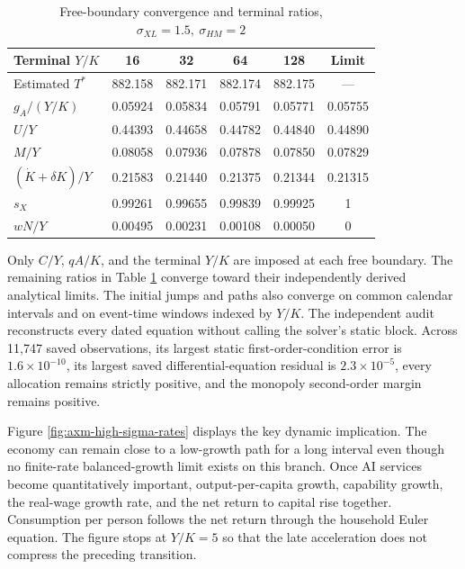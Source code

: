 \begin{table}[H]
\centering
\small
\caption{Free-boundary convergence and terminal ratios,
\(\sigma_{XL}=1.5,\ \sigma_{HM}=2\)}
\label{tab:axm-high-sigma-convergence}
\begin{tabular}{lccccc}
\toprule
Terminal \(Y/K\) & 16 & 32 & 64 & 128 & Limit\\
\midrule
Estimated \(T^*\) & 882.158 & 882.171 & 882.174 & 882.175 & ---\\
\(g_A/(Y/K)\) & 0.05924 & 0.05834 & 0.05791 & 0.05771 & 0.05755\\
\(U/Y\) & 0.44393 & 0.44658 & 0.44782 & 0.44840 & 0.44890\\
\(M/Y\) & 0.08058 & 0.07936 & 0.07878 & 0.07850 & 0.07829\\
\((\dot K+\delta K)/Y\) & 0.21583 & 0.21440 & 0.21375 & 0.21344 & 0.21315\\
\(s_X\) & 0.99261 & 0.99655 & 0.99839 & 0.99925 & 1\\
\(wN/Y\) & 0.00495 & 0.00231 & 0.00108 & 0.00050 & 0\\
\bottomrule
\end{tabular}
\end{table}

Only \(C/Y\), \(qA/K\), and the terminal \(Y/K\) are imposed at each free
boundary. The remaining ratios in Table
\ref{tab:axm-high-sigma-convergence} converge toward their independently derived
analytical limits. The initial jumps and paths also converge on common calendar
intervals and on event-time windows indexed by \(Y/K\). The independent audit
reconstructs every dated equation without calling the solver's static block.
Across 11,747 saved observations, its largest static first-order-condition error
is \(1.6\times10^{-10}\), its largest saved differential-equation residual is
\(2.3\times10^{-5}\), every allocation remains strictly positive, and the
monopoly second-order margin remains positive.

Figure \ref{fig:axm-high-sigma-rates} displays the key dynamic implication. The
economy can remain close to a low-growth path for a long interval even though no
finite-rate balanced-growth limit exists on this branch. Once AI services become
quantitatively important, output-per-capita growth, capability growth,
the real-wage growth rate, and the net return to capital rise together. Consumption
per person follows the net return through the household Euler equation. The
figure stops at \(Y/K=5\) so
that the late acceleration does not compress the preceding transition.

